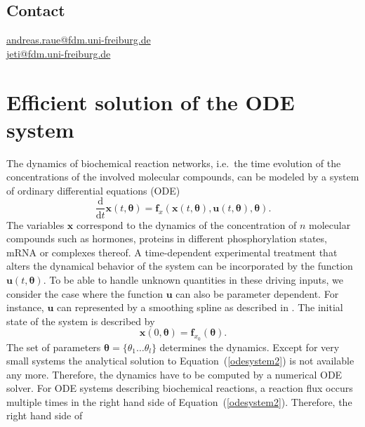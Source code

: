 \documentclass[12pt,a4paper]{scrartcl}
\newcommand{\DD}[2]{\frac{\mathrm{d} #1}{\mathrm{d} #2}}
\begin{document}
\subsection*{Contact}
\href{andreas.raue@fdm.uni-freiburg.de}{andreas.raue@fdm.uni-freiburg.de} \\
\href{jeti@fdm.uni-freiburg.de}{jeti@fdm.uni-freiburg.de}

\renewcommand*\contentsname{Contents}
\tableofcontents

\section{Efficient solution of the ODE system} \label{sec:ode_solvers}

The dynamics of biochemical reaction networks, i.e.~the time evolution of the concentrations 
of the involved molecular compounds, can be modeled by a system of ordinary 
differential equations (ODE)
\begin{equation}
	\DD{}{t}{\mathbf{x}}(t, \boldsymbol{\theta}) = \mathbf{f}_{x}(\mathbf{x}(t, 
\boldsymbol{\theta}), \mathbf{u}(t, \boldsymbol{\theta}), \boldsymbol{\theta}). 
\label{odesystem2}
\end{equation}
The variables $\mathbf{x}$ correspond to the dynamics of the concentration of $n$ 
molecular compounds such as hormones, proteins in different phosphorylation states, 
mRNA or complexes thereof. A time-dependent experimental treatment that alters the 
dynamical behavior of the system can be incorporated by the function $\mathbf{u}(t, 
\boldsymbol{\theta})$. To be able to handle unknown quantities in these driving inputs, we 
consider the case where the function $\mathbf{u}$ can also be parameter dependent. For 
instance, $\mathbf{u}$ can represented by a smoothing spline as described in 
\citet{Schelker:2012uq}. The initial state of the system is described by 
\begin{equation}
	\mathbf{x}(0, \boldsymbol{\theta}) = \mathbf{f}_{x_0}(\boldsymbol{\theta}). 
\label{init_ode_sys}
\end{equation}	
The set of parameters $\boldsymbol{\theta} = \{\theta_1 \dots \theta_l\}$ determines the  
dynamics. Except for very small systems the analytical solution to Equation~(\ref{odesystem2}) is 
not available any more. Therefore, the dynamics have to be computed by a numerical ODE 
solver. For ODE systems describing biochemical reactions, a reaction flux occurs multiple times in the right 
hand side of Equation~(\ref{odesystem2}). Therefore, the right hand side of 
\end{document}
